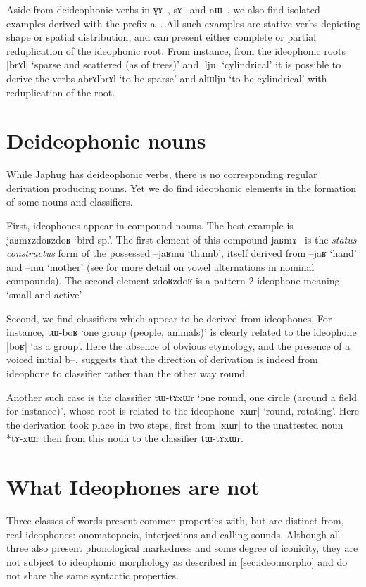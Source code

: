 \documentclass[oldfontcommands,oneside,a4paper,11pt]{article}
\newcommand{\ipa}[1]{{\phon \mbox{#1}}} %
\begin{document}
Aside from deideophonic verbs in \ipa{ɣɤ--}, \ipa{sɤ--} and \ipa{nɯ--}, we also find isolated examples derived with the prefix \ipa{a--}. All such examples are stative verbs depicting shape or spatial distribution, and can present either complete or partial reduplication of the ideophonic  root. From instance, from the ideophonic roots |\ipa{brɤl}| `sparse and scattered (as of trees)' and |lju| `cylindrical' it is possible to derive the verbs \ipa{abrɤlbrɤl} `to be sparse' and \ipa{alɯlju} `to be cylindrical' with reduplication of the root.
 
 \section{Deideophonic nouns}
While Japhug has  deideophonic verbs, there is no corresponding regular derivation producing nouns. Yet we do find ideophonic elements in the formation of some nouns and classifiers.
 
 
 
 
 First, ideophones appear in compound nouns. The best example is \ipa{jaʁmɤzdoʁzdoʁ} `bird sp.'. The first element of this compound \ipa{jaʁmɤ--} is the \textit{status constructus} form of the possessed \ipa{--jaʁmu} `thumb', itself derived from \ipa{--jaʁ} `hand' and \ipa{--mu} `mother' (see \citealt{jacques12incorp} for more detail on vowel alternations in nominal compounds). The second element \ipa{zdoʁzdoʁ} is a pattern 2 ideophone meaning `small and active'.


Second, we find classifiers which appear to be derived from ideophones. For instance, \ipa{tɯ-boʁ} `one group (people, animals)' is clearly related to the ideophone |\ipa{boʁ}| `as a group'. Here the absence of obvious etymology, and the presence of a voiced initial \ipa{b--}, suggests that the direction of derivation is indeed from ideophone to classifier rather than the other way round.

Another such case is the classifier \ipa{tɯ-tɤxɯr} `one round, one circle (around a field for instance)', whose root is related to the ideophone |\ipa{xɯr}|  `round, rotating'. Here the derivation took place in two steps, first from  |\ipa{xɯr}|   to the unattested noun *\ipa{tɤ-xɯr} then from this noun to the classifier \ipa{tɯ-tɤxɯr}.


\section{What Ideophones are not} \label{sec:non.ideophones}
Three classes of words present common properties with, but are distinct from, real ideophones: onomatopoeia, interjections and calling sounds. Although all three also present phonological markedness and some degree of iconicity, they are not subject to ideophonic morphology as described in \ref{sec:ideo:morpho} and do not share the same syntactic properties.
\end{document}
